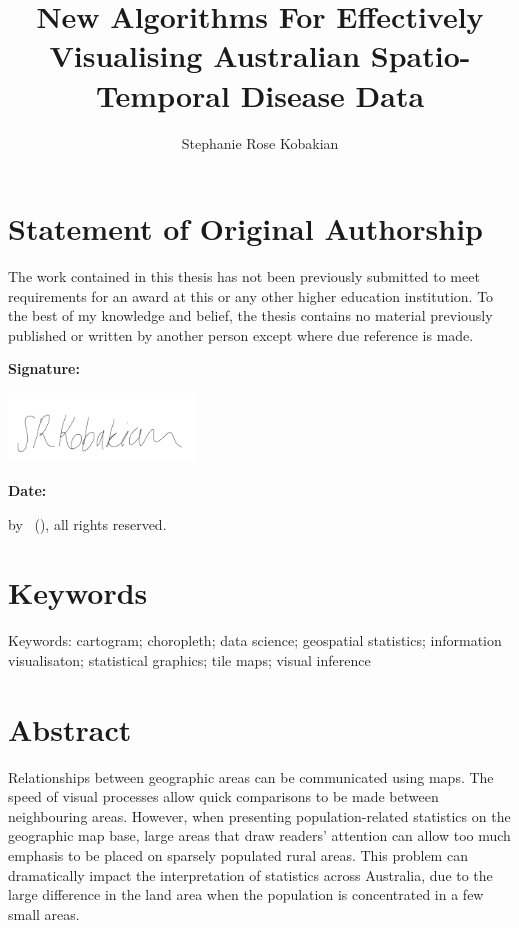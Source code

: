 \documentclass{monashthesis}
\author{Stephanie Rose Kobakian}
\title{New Algorithms For Effectively Visualising Australian Spatio-Temporal Disease Data}
\begin{document}

\titlepage

{\sf\tighttoc\doublespacing}

\hypertarget{statement-of-original-authorship}{%
\chapter*{Statement of Original Authorship}\label{statement-of-original-authorship}}

The work contained in this thesis has not been previously submitted to meet requirements for an award at this or any other higher education institution. To the best of my knowledge and belief, the thesis contains no material previously published or written by another person except where due reference is made.

\textbf{Signature:}

\includegraphics[width=5cm]{figures/srksig}

\textbf{Date:}

\textcopyright { } by \authorname~(\number\the\year), all rights reserved.

\newpage

\hypertarget{keywords}{%
\chapter*{Keywords}\label{keywords}}

Keywords:
cartogram; choropleth; data science; geospatial statistics; information visualisaton; statistical graphics; tile maps; visual inference

\hypertarget{abstract}{%
\chapter*{Abstract}\label{abstract}}

Relationships between geographic areas can be communicated using maps. The speed of visual processes allow quick comparisons to be made between neighbouring areas. However, when presenting population-related statistics on the geographic map base, large areas that draw readers' attention can allow too much emphasis to be placed on sparsely populated rural areas.
This problem can dramatically impact the interpretation of statistics across Australia, due to the large difference in the land area when the population is concentrated in a few small areas.
\end{document}

